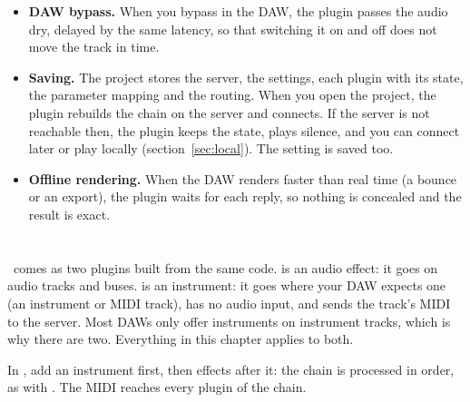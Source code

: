 \begin{itemize}
  \item \textbf{DAW bypass.} When you bypass  in the DAW, the
    plugin passes the audio dry, delayed by the same latency, so that
    switching it on and off does not move the track in time.
  \item \textbf{Saving.} The project stores the server, the settings, each
    plugin with its state, the parameter mapping and the routing. When you open
    the project, the plugin rebuilds the chain on the server and connects. If
    the server is not reachable then, the plugin keeps the state, plays
    silence, and you can connect later or play locally
    (section~\ref{sec:local}). The  setting is saved too.
  \item \textbf{Offline rendering.} When the DAW renders faster than real
    time (a bounce or an export), the plugin waits for each reply, so
    nothing is concealed and the result is exact.
\end{itemize}

\section{}
\label{sec:instrument}

\fxme\ comes as two plugins built from the same code.  is an
audio effect: it goes on audio tracks and buses.  is
an instrument: it goes where your DAW expects one (an instrument or MIDI
track), has no audio input, and sends the track's MIDI to the server. Most
DAWs only offer instruments on instrument tracks, which is why there are two.
Everything in this chapter applies to both.

In , add an instrument first, then effects after it:
the chain is processed in order, as with . The MIDI reaches every
plugin of the chain.

